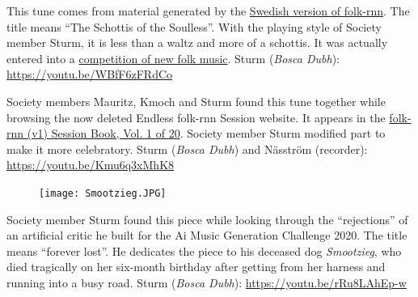\documentclass[a4paper,notitlepage,twoside]{book}
\begin{document}
{}  
  
\hypertarget{piece:SjallosasSchottis}{}
This tune comes from material generated by the \href{https://themachinefolksession.org/tune/1012}{Swedish version of folk-rnn}.
The title means ``The Schottis of the Soulless''.
With the playing style of Society member Sturm, it is less than a waltz and more of a schottis.
It was actually entered into a \href{https://www.stallet.st/sv/latskrivartavling}{competition of new folk music}.
Sturm ({\em Bosca Dubh}): \url{https://youtu.be/WBfF6zFRdCo}

{}  
\hypertarget{piece:CuckoosWedding}{}
Society members Mauritz, Kmoch and Sturm found this tune together 
while browsing the now deleted Endless folk-rnn Session website.
It appears in the \href{https://highnoongmt.wordpress.com/2018/01/05/volumes-1-20-of-folk-rnn-v1-transcriptions}{folk-rnn (v1) Session Book, Vol. 1 of 20}.
Society member Sturm modified part to make it more celebratory.
Sturm ({\em Bosca Dubh}) and Näsström (recorder): \url{https://youtu.be/Kmu6q3xMhK8}

{}  
\hypertarget{piece:EvigtForlorad}{}
\begin{figure}
\vspace{-0.3in}
\texttt{[image: Smootzieg.JPG]}
\end{figure}
Society member Sturm found this piece while looking through
the ``rejections'' of an artificial critic he built for the 
Ai Music Generation Challenge 2020.
The title means ``forever lost''.
He dedicates the piece to his deceased dog {\em Smootzieg},
who died tragically on her six-month birthday after 
getting from her harness and running into a busy road.
Sturm ({\em Bosca Dubh}): \url{https://youtu.be/rRu8LAhEp-w}
\end{document}
